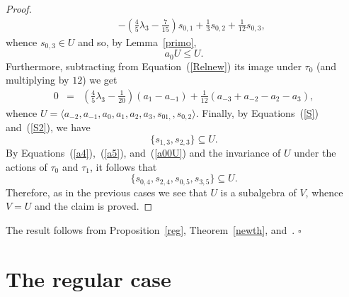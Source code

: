 \documentclass[a4paper]{amsart}
\newcommand{\lmt}{\lambda_3}
\begin{document}
\begin{proof}
\begin{eqnarray}
&&-(\tfrac{4}{5}\lmt -\tfrac{7}{15})s_{0,1}+\tfrac{1}{3}s_{0,2}
+\tfrac{1}{12}s_{0,3}, 
\end{eqnarray}
whence $s_{0,3}\in U$ and so, by Lemma~\ref{primo},
\begin{equation}\label{a00U}
a_0U\leq U.
\end{equation} 
Furthermore, subtracting from Equation~(\ref{Relnew}) its image under $\tau_0$ (and multiplying by $12$) we get  
\begin{eqnarray*}\label{Relnew1}
0&=&(\tfrac{4}{5}\lmt-\tfrac{1}{20})(a_1-a_{-1})+\tfrac{1}{12}(a_{-3}+a_{-2}-a_{2}-a_{3}), 
\end{eqnarray*}
whence $U=\langle a_{-2}, a_{-1}, a_0, a_1, a_2, a_3, s_{01,}, s_{0,2}\rangle$. 
Finally, by Equations~(\ref{S}) and~(\ref{S2}), we have
\begin{equation}\label{s33}
\{s_{1,3}, s_{2,3}\}\subseteq U.
\end{equation}
By Equations~(\ref{a4}),~(\ref{a5}), and~(\ref{a00U}) and the invariance of $U$ under the actions of $\tau_0$ and $\tau_1$, it follows that 
$$
\{ s_{0,4}, s_{2,4}, s_{0,5}, s_{3,5} \} \subseteq U. 
$$
Therefore, 
as in the previous cases we see that $U$ is a subalgebra of $V$, whence $V=U$ and the claim is proved.
\end{proof}

The result follows from Proposition~\ref{reg}, Theorem~\ref{newth}, and~\cite[Theorem~1.1]{FMS2}.
\hfill$\square$

\section{The regular case} \label{generic}
\end{document}
